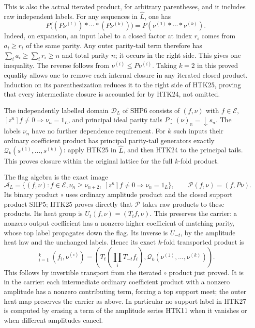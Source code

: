 This is also the actual iterated product, for arbitrary
parentheses, and it includes raw independent labels.
For any sequences in $\widehat L$, one has
\begin{equation}\tag{HTK25}
 P\bigl((P\nu^{(1)})*\cdots*(P\nu^{(k)})\bigr)
                  =P(\nu^{(1)}*\cdots*\nu^{(k)}).
\end{equation}
Indeed, on expansion, an input label to a closed factor at
index $r_i$ comes from $a_i\ge r_i$ of the same parity.
Any outer parity-tail term therefore has
$\sum_i a_i\ge\sum_i r_i\ge n$ and total parity $n$;
it occurs in the right side. This gives one inequality.
The reverse follows from $\nu^{(i)}\le P\nu^{(i)}$.
Taking $k=2$ in this proved equality allows one to remove
each internal closure in any iterated closed product.
Induction on its parenthesization reduces it to the right
side of HTK25, proving that every intermediate closure is
accounted for by HTK24, not omitted.

The independently labelled domain $\mathcal D_L$ of SHP6
consists of $(f,\nu)$ with $f\in\mathcal E$,
$[z^n]f\ne0\Rightarrow\nu_n=1_L$, and principal ideal
parity tails $P\jmath(\nu)_n=\downarrow s_n$.
The labels $\nu_n$ have no further dependence requirement.
For $k$ such inputs their ordinary coefficient product has
principal parity-tail generators exactly
$\mathscr Q_k(s^{(1)},\ldots,s^{(k)})$:
apply HTK25 in $\widehat L$, and then HTK24 to the
principal tails. This proves closure within the original
lattice for the full $k$-fold product.

The flag algebra is the exact image
\begin{equation}\tag{HTK26}
 \mathcal A_L=\{(f,\nu):f\in\mathcal E, \nu_n\ge\nu_{n+2},
               \ [z^n]f\ne0\Rightarrow\nu_n=1_L\},
 \qquad \mathcal P(f,\nu)=(f,P\nu).
\end{equation}
Its binary product $\circ$ uses ordinary amplitude product
and the closed support product SHP5; HTK25 proves directly
that $\mathcal P$ takes raw products to these products.
Its heat group is $U_t(f,\nu)=(T_tf,\nu)$.
This preserves the carrier: a nonzero output coefficient
has a nonzero higher coefficient of matching parity, whose
top label propagates down the flag. Its inverse is $U_{-t}$,
by the amplitude heat law and the unchanged labels.
Hence its exact $k$-fold transported product is
\begin{equation}\tag{HTK27}
 \mathop{\star_t}_{i=1}^k(f_i,\nu^{(i)})
   =\left(T_t\left(\prod_iT_{-t}f_i\right),
                  \mathscr Q_k(\nu^{(1)},\ldots,\nu^{(k)})\right).
\end{equation}
This follows by invertible transport from the iterated
$\circ$ product just proved. It is in the carrier: each
intermediate ordinary coefficient product with a nonzero
amplitude has a nonzero contributing term, forcing a top
support meet; the outer heat map preserves the carrier as
above. In particular no support label in HTK27 is computed
by erasing a term of the amplitude series HTK11 when it
vanishes or when different amplitudes cancel.

